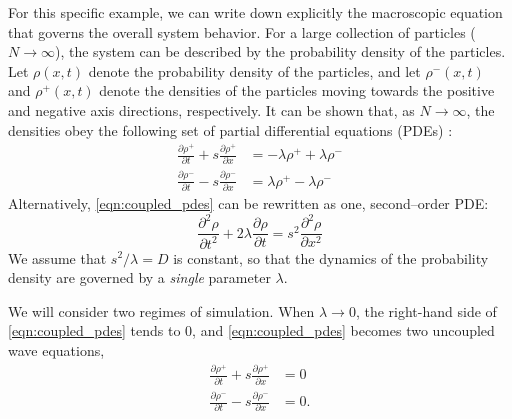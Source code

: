 \documentclass[prl, reprint, final, showkeys]{revtex4-1}
\begin{document}

For this specific example, we can write down explicitly the macroscopic equation that governs the overall system behavior.
%
For a large collection of particles ($N \rightarrow \infty$), the system can be described by the probability density of the particles.
%
Let $\rho(x, t)$ denote the probability density of the particles, and let $\rho^-(x, t)$ and $\rho^+(x, t)$ denote the densities of the particles moving towards the positive and negative axis directions, respectively.
%
It can be shown that, as $N \rightarrow \infty$, the densities obey the following set of partial differential equations (PDEs) \cite{othmer2000diffusion}:
\begin{equation} \label{eqn:coupled_pdes}
\begin{aligned}
\frac{\partial \rho^+}{\partial t} + s \frac{\partial \rho^+}{\partial x} & = -\lambda \rho^+ +\lambda \rho^- \\
\frac{\partial \rho^-}{\partial t} - s \frac{\partial \rho^-}{\partial x} & = \lambda \rho^+ -\lambda \rho^- 
\end{aligned}
\end{equation}
%
Alternatively, \eqref{eqn:coupled_pdes} can be rewritten as one, second--order PDE:
\begin{equation} \label{eq:second_order_pde}
\frac{\partial^2 \rho}{\partial t^2} + 2 \lambda \frac{\partial \rho}{\partial t} = s^2 \frac{\partial ^2 \rho}{\partial x^2}
\end{equation}
%
We assume that $s^2/\lambda = D$ is constant, so that the dynamics of the probability density are governed by a {\em single} parameter $\lambda$.


We will consider two regimes of simulation.
%
When $\lambda \rightarrow 0$, the right-hand side of \eqref{eqn:coupled_pdes} tends to 0, and \eqref{eqn:coupled_pdes} becomes two uncoupled wave equations,
\begin{equation}
\begin{aligned}
\frac{\partial \rho^+}{\partial t} + s \frac{\partial \rho^+}{\partial x} & = 0 \\
\frac{\partial \rho^-}{\partial t} - s \frac{\partial \rho^-}{\partial x} & = 0.
\end{aligned}
\end{equation}
\end{document}
